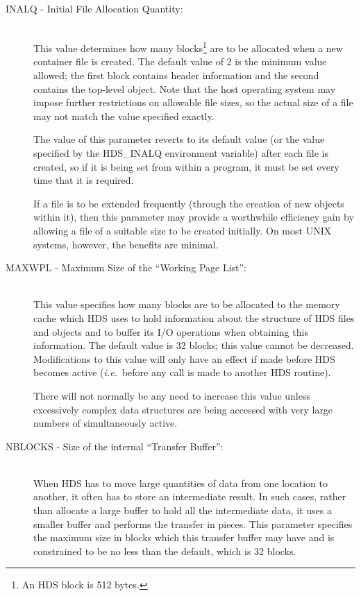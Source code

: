 \documentclass[twoside,11pt]{starlink}
\providecommand{\qt}[1]{``#1''}
\providecommand{\st}[1]{{\emph{#1}}}
\providecommand{\htmltext}[1]{}
\begin{document}
\begin{description}

\item [INALQ - Initial File Allocation Quantity:]\mbox{}\\
This value determines how many blocks\footnote{An HDS block is 512
bytes.} are to be allocated when a new container file is created. The
default value of 2 is the minimum value allowed; the first block
contains header information and the second contains the top-level
object. Note that the host operating system may impose further
restrictions on allowable file sizes, so the actual size of a file may
not match the value specified exactly.

The value of this parameter reverts to its default value (or the value
specified by the HDS\_INALQ environment variable) after each file is
created, so if it is being set from within a program, it must be set
every time that it is required.

If a file is to be extended frequently (through the creation of new
objects within it), then this parameter may provide a worthwhile
efficiency gain by allowing a file of a suitable size to be created
initially. On most UNIX systems, however, the benefits are minimal.

\item [MAXWPL - Maximum Size of the \qt{Working Page List}:]\mbox{}\\
This value specifies how many blocks\htmltext{\footnote{An HDS block
is 512 bytes.}}  are to be allocated to the memory cache which HDS
uses to hold information about the structure of HDS files and objects
and to buffer its I/O operations when obtaining this information. The
default value is 32 blocks; this value cannot be
decreased. Modifications to this value will only have an effect if
made before HDS becomes active (\st{i.e.}\ before any call is made to
another HDS routine).

There will not normally be any need to increase this value unless
excessively complex data structures are being accessed with very large
numbers of  simultaneously active.

\item [NBLOCKS - Size of the internal \qt{Transfer Buffer}:]\mbox{}\\
When HDS has to move large quantities of data from one location to
another, it often has to store an intermediate result. In such cases,
rather than allocate a large buffer to hold all the intermediate data,
it uses a smaller buffer and performs the transfer in pieces. This
parameter specifies the maximum size in blocks\htmltext{\footnote{An
HDS block is 512 bytes.}} which this transfer buffer may have and is
constrained to be no less than the default, which is 32 blocks.


\end{description}
\end{document}
